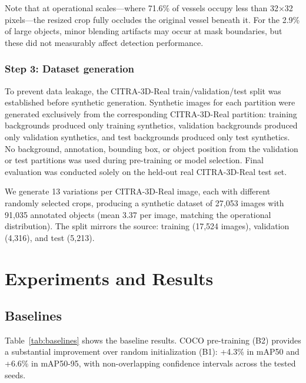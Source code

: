\documentclass[a4paper,fleqn]{cas-dc}
\begin{document}
Note that at operational scales---where 71.6\% of vessels occupy less than 32$\times$32 pixels---the resized crop fully occludes the original vessel beneath it. For the 2.9\% of large objects, minor blending artifacts may occur at mask boundaries, but these did not measurably affect detection performance.

\subsubsection{Step 3: Dataset generation}

To prevent data leakage, the CITRA-3D-Real train/validation/test split was established before synthetic generation. Synthetic images for each partition were generated exclusively from the corresponding CITRA-3D-Real partition: training backgrounds produced only training synthetics, validation backgrounds produced only validation synthetics, and test backgrounds produced only test synthetics. No background, annotation, bounding box, or object position from the validation or test partitions was used during pre-training or model selection. Final evaluation was conducted solely on the held-out real CITRA-3D-Real test set.

We generate 13 variations per CITRA-3D-Real image, each with different randomly selected crops, producing a synthetic dataset of 27,053 images with 91,035 annotated objects (mean 3.37 per image, matching the operational distribution). The split mirrors the source: training (17,524 images), validation (4,316), and test (5,213).

\section{Experiments and Results}\label{sec:results}

\subsection{Baselines}\label{sec:baselines}

Table~\ref{tab:baselines} shows the baseline results. COCO pre-training (B2) provides a substantial improvement over random initialization (B1): +4.3\% in mAP50 and +6.6\% in mAP50-95, with non-overlapping confidence intervals across the tested seeds.
\end{document}
